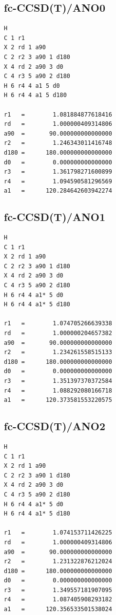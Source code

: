 \subsection{fc-CCSD(T)/ANO0}
\begin{verbatim}
H
C 1 r1
X 2 rd 1 a90
C 2 r2 3 a90 1 d180
X 4 rd 2 a90 3 d0
C 4 r3 5 a90 2 d180
H 6 r4 4 a1 5 d0
H 6 r4 4 a1 5 d180

r1   =        1.081884877618416
rd   =        1.000000409314806
a90  =       90.000000000000000
r2   =        1.246343011416748
d180 =      180.000000000000000
d0   =        0.000000000000000
r3   =        1.361798271600899
r4   =        1.094590581296569
a1   =      120.284642603942274
\end{verbatim}

\subsection{fc-CCSD(T)/ANO1}
\begin{verbatim}
H
C 1 r1
X 2 rd 1 a90
C 2 r2 3 a90 1 d180
X 4 rd 2 a90 3 d0
C 4 r3 5 a90 2 d180
H 6 r4 4 a1* 5 d0
H 6 r4 4 a1* 5 d180

r1   =        1.074705266639338
rd   =        1.000000204657382
a90  =       90.000000000000000
r2   =        1.234261558515133
d180 =      180.000000000000000
d0   =        0.000000000000000
r3   =        1.351397370372584
r4   =        1.088292080166718
a1   =      120.373581553220575    
\end{verbatim}


\subsection{fc-CCSD(T)/ANO2}
\begin{verbatim}
H
C 1 r1
X 2 rd 1 a90
C 2 r2 3 a90 1 d180
X 4 rd 2 a90 3 d0
C 4 r3 5 a90 2 d180
H 6 r4 4 a1* 5 d0
H 6 r4 4 a1* 5 d180

r1   =        1.074153711426225
rd   =        1.000000409314806
a90  =       90.000000000000000
r2   =        1.231322876212024
d180 =      180.000000000000000
d0   =        0.000000000000000
r3   =        1.349557181907095
r4   =        1.087405908293182
a1   =      120.356533501538024
\end{verbatim}

